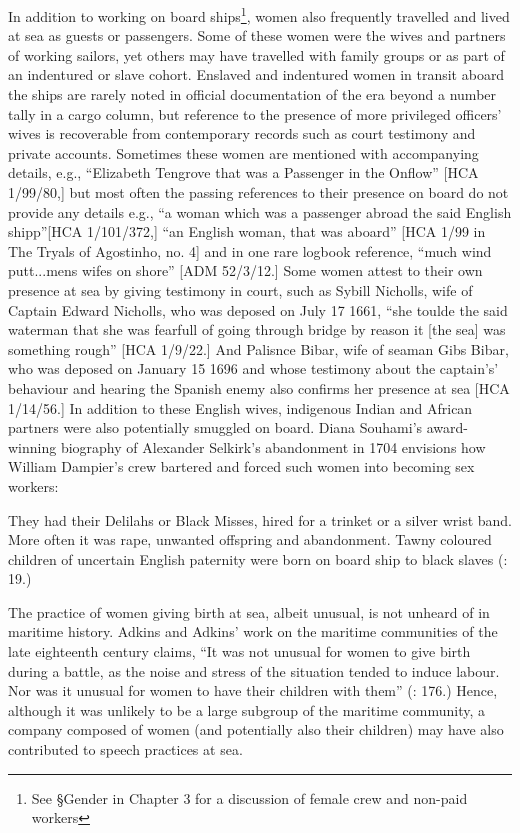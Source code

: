 In addition to working on board ships\footnote{See §Gender in Chapter 3 for a discussion of female crew and non-paid workers}, women also frequently travelled and lived at sea as guests or passengers. Some of these women were the wives and partners of working sailors, yet others may have travelled with family groups or as part of an indentured or slave cohort. Enslaved and indentured women in transit aboard the ships are rarely noted in official documentation of the era beyond a number tally in a cargo column, but reference to the presence of more privileged officers’ wives is recoverable from contemporary records such as court testimony and private accounts. Sometimes these women are mentioned with accompanying details, e.g., “Elizabeth Tengrove that was a Passenger in the Onflow” [HCA 1/99/80,] but most often the passing references to their presence on board do not provide any details e.g., “a woman which was a passenger abroad the said English shipp”[HCA 1/101/372,] “an English woman, that was aboard” [HCA 1/99 in The Tryals of Agostinho, no. 4] and in one rare logbook reference, “much wind putt...mens wifes on shore” [ADM 52/3/12.] Some women attest to their own presence at sea by giving testimony in court, such as Sybill Nicholls, wife of Captain Edward Nicholls, who was deposed on July 17 1661, “she toulde the said waterman that she was fearfull of going through bridge by reason it [the sea] was something rough” [HCA 1/9/22.] And Palisnce Bibar, wife of seaman Gibs Bibar, who was deposed on January 15 1696 and whose testimony about the captain's’ behaviour and hearing the Spanish enemy also confirms her presence at sea [HCA 1/14/56.] In addition to these English wives, indigenous Indian and African partners were also potentially smuggled on board. Diana Souhami’s award-winning biography of Alexander Selkirk’s abandonment in 1704 envisions how William Dampier’s crew bartered and forced such women into becoming sex workers:

They had their Delilahs or Black Misses, hired for a trinket or a silver wrist band. More often it was rape, unwanted offspring and abandonment. Tawny coloured children of uncertain English paternity were born on board ship to black slaves (\citealt{Souhami2013}: 19.)

The practice of women giving birth at sea, albeit unusual, is not unheard of in maritime history. Adkins and Adkins’ work on the maritime communities of the late eighteenth century claims, “It was not unusual for women to give birth during a battle, as the noise and stress of the situation tended to induce labour. Nor was it unusual for women to have their children with them” (\citealt{AdkinsAdkins2008}: 176.) Hence, although it was unlikely to be a large subgroup of the maritime community, a company composed of women (and potentially also their children) may have also contributed to speech practices at sea. 

